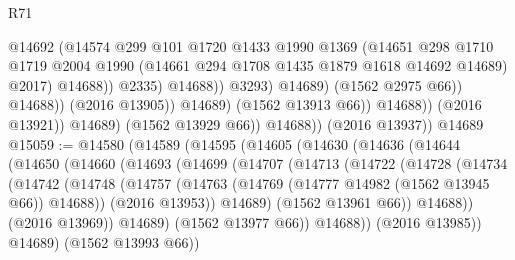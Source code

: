 \begin{lexlean}{R71}
\begin{coremodule}
                                            @14692
                                            (@14574
                                              @299
                                              @101
                                              @1720
                                              @1433
                                              @1990
                                              @1369
                                              (@14651
                                                @298
                                                @1710
                                                @1719
                                                @2004
                                                @1990
                                                (@14661 @294 @1708 @1435 @1879 @1618 @14692 @14689)
                                                @2017)
                                              @14688))
                                          @2335)
                                        @14688))
                                    @3293)
                                  @14689)
                                (@1562 @2975 @66))
                              @14688))
                          (@2016 @13905))
                        @14689)
                      (@1562 @13913 @66))
                    @14688))
                (@2016 @13921))
              @14689)
            (@1562 @13929 @66))
          @14688))
      (@2016 @13937))
    @14689
@15059 := @14580
    (@14589
      (@14595
        (@14605
          (@14630
            (@14636
              (@14644
                (@14650
                  (@14660
                    (@14693
                      (@14699
                        (@14707
                          (@14713
                            (@14722
                              (@14728
                                (@14734
                                  (@14742
                                    (@14748
                                      (@14757
                                        (@14763 (@14769 (@14777 @14982 (@1562 @13945 @66)) @14688))
                                        (@2016 @13953))
                                      @14689)
                                    (@1562 @13961 @66))
                                  @14688))
                              (@2016 @13969))
                            @14689)
                          (@1562 @13977 @66))
                        @14688))
                    (@2016 @13985))
                  @14689)
                (@1562 @13993 @66))

\end{coremodule}
\end{lexlean}
